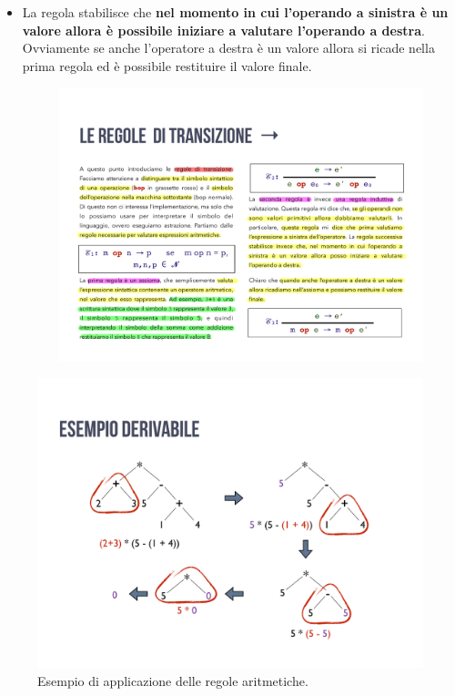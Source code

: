 \documentclass[a4paper]{article}
\begin{document}
\begin{itemize}
		\item La regola stabilisce che \textbf{nel momento in cui l'operando a sinistra è un valore allora è possibile iniziare a valutare l'operando a destra}. Ovviamente se anche l'operatore a destra è un valore allora si ricade nella prima regola ed è possibile restituire il valore finale.
		\begin{figure}[!htp]
			\centering
			\includegraphics[width=.65\textwidth]{img/regola_transizione-3.pdf}
		\end{figure}
	\end{itemize}\newpage
	
	\begin{figure}[!htp]
		\centering
		\includegraphics[width=\textwidth]{img/esempio_regole_aritmetiche.pdf}
		\caption{Esempio di applicazione delle regole aritmetiche.}
	\end{figure}
	
\end{document}
